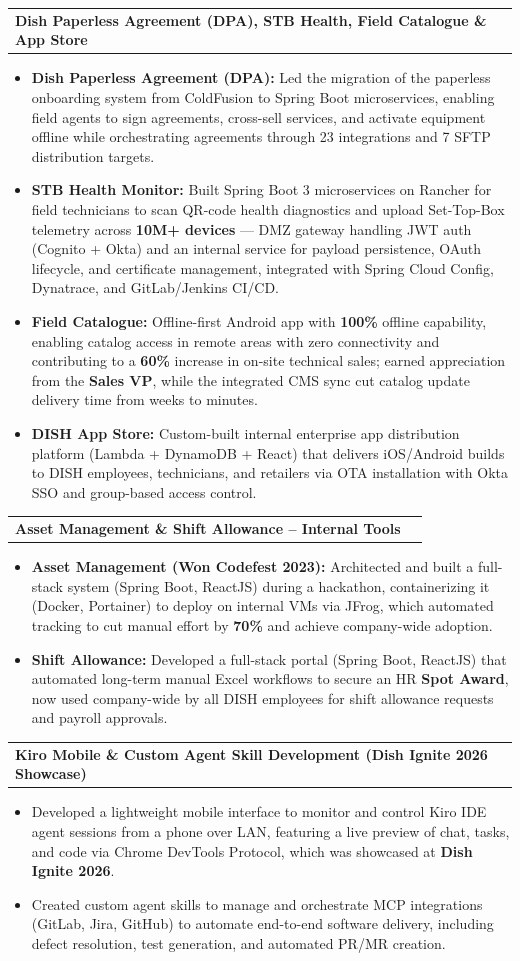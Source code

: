 \documentclass[letterpaper,11pt]{article}
\makeatletter
\newcommand{\resumeItem}[1]{
  \item\small{
    {#1 \vspace{-2pt}}
  }
}
\newcommand{\resumeProjectHeading}[2]{
    \item
    \begin{tabular*}{1.001\textwidth}{l@{\extracolsep{\fill}}r}
      \small#1 & \textbf{\small #2}\\
    \end{tabular*}\vspace{-7pt}
}
\newcommand{\resumeItemListStart}{\begin{itemize}}
\newcommand{\resumeItemListEnd}{\end{itemize}\vspace{-5pt}}
\makeatother
\begin{document}
\vspace{-12pt}
\resumeProjectHeading
    {\textbf{Dish Paperless Agreement (DPA), STB Health, Field Catalogue \& App Store}}{}
\resumeItemListStart
\resumeItem{\textbf{Dish Paperless Agreement (DPA):} Led the migration of the paperless onboarding system from ColdFusion to Spring Boot microservices, enabling field agents to sign agreements, cross-sell services, and activate equipment offline while orchestrating agreements through 23 integrations and 7 SFTP distribution targets.}
\resumeItem{\textbf{STB Health Monitor:} Built Spring Boot 3 microservices on Rancher for field technicians to scan QR-code health diagnostics and upload Set-Top-Box telemetry across \textbf{10M+ devices} — DMZ gateway handling JWT auth (Cognito + Okta) and an internal service for payload persistence, OAuth lifecycle, and certificate management, integrated with Spring Cloud Config, Dynatrace, and GitLab/Jenkins CI/CD.}
\resumeItem{\textbf{Field Catalogue:} Offline-first Android app with \textbf{100\%} offline capability, enabling catalog access in remote areas with zero connectivity and contributing to a \textbf{60\%} increase in on-site technical sales; earned appreciation from the \textbf{Sales VP}, while the integrated CMS sync cut catalog update delivery time from weeks to minutes.}
\resumeItem{\textbf{DISH App Store:} Custom-built internal enterprise app distribution platform (Lambda + DynamoDB + React) that delivers iOS/Android builds to DISH employees, technicians, and retailers via OTA installation with Okta SSO and group-based access control.}
\resumeItemListEnd

\vspace{-12pt}
\resumeProjectHeading
   {\textbf{Asset Management \& Shift Allowance -- Internal Tools}}{}
\resumeItemListStart
 \resumeItem{\textbf{Asset Management (Won Codefest 2023):} Architected and built a full-stack system (Spring Boot, ReactJS) during a hackathon, containerizing it (Docker, Portainer) to deploy on internal VMs via JFrog, which automated tracking to cut manual effort by \textbf{70\%} and achieve company-wide adoption.}
 \resumeItem{\textbf{Shift Allowance:} Developed a full-stack portal (Spring Boot, ReactJS) that automated long-term manual Excel workflows to secure an HR \textbf{Spot Award}, now used company-wide by all DISH employees for shift allowance requests and payroll approvals.}
\resumeItemListEnd

\vspace{-12pt}
\resumeProjectHeading
    {\textbf{Kiro Mobile \& Custom Agent Skill Development (Dish Ignite 2026 Showcase)}}{}
\resumeItemListStart
\resumeItem{Developed a lightweight mobile interface to monitor and control Kiro IDE agent sessions from a phone over LAN, featuring a live preview of chat, tasks, and code via Chrome DevTools Protocol, which was showcased at \textbf{Dish Ignite 2026}.}
\resumeItem{Created custom agent skills to manage and orchestrate MCP integrations (GitLab, Jira, GitHub) to automate end-to-end software delivery, including defect resolution, test generation, and automated PR/MR creation.}
\resumeItemListEnd
\end{document}
